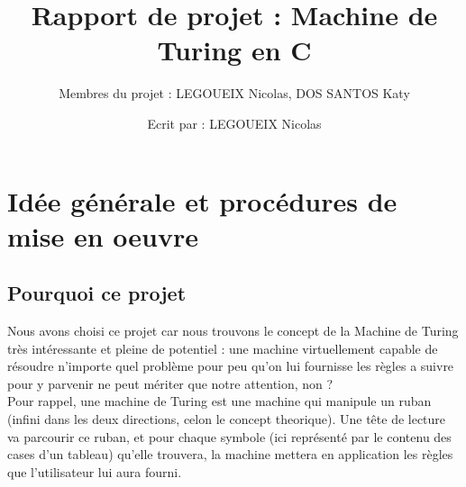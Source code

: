 \documentclass[12pt,a4paper]{report}
\title{Rapport de projet : Machine de Turing en C}
\author{Membres du projet : LEGOUEIX Nicolas, DOS SANTOS Katy \\ \and Ecrit par : LEGOUEIX Nicolas}
\date{}
\begin{document}
\maketitle
\tableofcontents
\newpage
\chapter{Idée générale et procédures de mise en oeuvre}
\section{Pourquoi ce projet}
Nous avons choisi ce projet car nous trouvons le concept de la Machine de Turing très intéressante et pleine de potentiel : une machine virtuellement capable de résoudre n'importe quel problème pour peu qu'on lui fournisse les règles a suivre pour y parvenir ne peut mériter que notre attention, non ?\\
Pour rappel, une machine de Turing est une machine qui manipule un ruban (infini dans les deux directions, celon le concept theorique). Une tête de lecture va parcourir ce ruban, et pour chaque symbole (ici représenté par le contenu des cases d'un tableau) qu'elle trouvera, la machine mettera en application les règles que l'utilisateur lui aura fourni.
\end{document}

